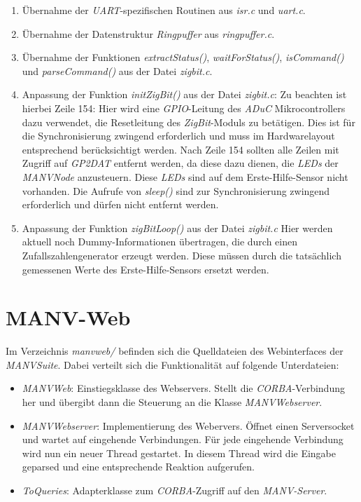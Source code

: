     \begin{enumerate}
        \item Übernahme der \emph{UART}-spezifischen Routinen aus \emph{isr.c} und \emph{uart.c}. 
        \item Übernahme der Datenstruktur \emph{Ringpuffer} aus \emph{ringpuffer.c}.
        \item Übernahme der Funktionen \emph{extractStatus()}, \emph{waitForStatus()}, \emph{isCommand()}
              und \emph{parseCommand()} aus der Datei \emph{zigbit.c}.
        \item Anpassung der Funktion \emph{initZigBit()} aus der Datei \emph{zigbit.c}:
              Zu beachten ist hierbei Zeile 154: Hier wird eine \emph{GPIO}-Leitung des \emph{ADuC} Mikrocontrollers 
              dazu verwendet,
              die Resetleitung des \emph{ZigBit}-Moduls zu betätigen. Dies ist für die Synchronisierung
              zwingend erforderlich und muss im Hardwarelayout entsprechend berücksichtigt werden.
              Nach Zeile 154 sollten alle Zeilen mit Zugriff auf \emph{GP2DAT} entfernt werden, 
              da diese dazu dienen, die \emph{LEDs} der \emph{MANVNode} anzusteuern. Diese \emph{LEDs} sind
              auf dem Erste-Hilfe-Sensor nicht vorhanden. Die Aufrufe von \emph{sleep()} sind zur Synchronisierung
              zwingend erforderlich und dürfen nicht entfernt werden.
        \item Anpassung der Funktion \emph{zigBitLoop()} aus der Datei \emph{zigbit.c} Hier werden aktuell noch 
              Dummy-Informationen übertragen, die durch einen Zufallszahlengenerator erzeugt werden. Diese
              müssen durch die tatsächlich gemessenen Werte des Erste-Hilfe-Sensors ersetzt werden.
    \end{enumerate}                


    \section{MANV-Web}
    Im Verzeichnis \emph{manvweb/} befinden sich die Quelldateien des Webinterfaces der
    \emph{MANV\-Suite}. Dabei verteilt sich die Funktionalität auf folgende Unterdateien:

    \begin{itemize}
        \item{\emph{MANVWeb}:} Einstiegsklasse des Webservers. Stellt die \emph{CORBA}-Verbindung her
                        und übergibt dann die Steuerung an die Klasse \emph{MANVWebserver}.
        \item{\emph{MANVWebserver}:} Implementierung des Webervers. Öffnet einen Serversocket und
                              wartet auf eingehende Verbindungen. Für jede eingehende Verbindung
                              wird nun ein neuer Thread gestartet. In diesem Thread
                              wird die Eingabe geparsed und eine entsprechende Reaktion
                              aufgerufen. 
        \item{\emph{ToQueries}:} Adapterklasse zum \emph{CORBA}-Zugriff auf den \emph{MANV-Server}. 
    \end{itemize}

